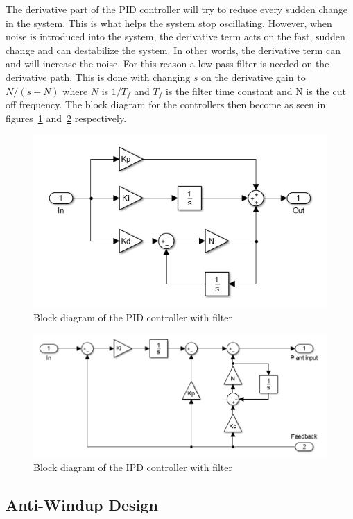 The derivative part of the PID controller will try to reduce every sudden change in the system. This is what helps the system stop oscillating. However, when noise is introduced into the system, the derivative term acts on the fast, sudden change and can destabilize the system. In other words, the derivative term can and will increase the noise. For this reason a low pass filter is needed on the derivative path. This is done with changing $s$ on the derivative gain to $N/(s + N)$ where $N$ is $1/T_f$ and $T_f$ is the filter time constant and N is the cut off frequency. The block diagram for the controllers then become as seen in figures~\ref{fig:pidfilter} and~\ref{fig:ipdfilter} respectively.

\begin{figure}[!h]
	\centering
	\includegraphics[width=.7\linewidth]{graphics/pidwfilter}
	\caption{Block diagram of the PID controller with filter}
	\label{fig:pidfilter}
\end{figure}

\begin{figure}[!h]
	\centering
	\includegraphics[width=.9\linewidth]{graphics/ipdwfilter}
	\caption{Block diagram of the IPD controller with filter}
	\label{fig:ipdfilter}
\end{figure}


\subsection{Anti-Windup Design}


